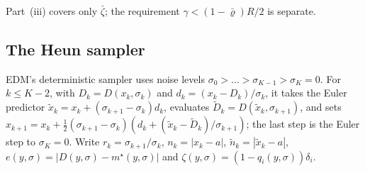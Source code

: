 \documentclass{article} %
\theoremstyle{plain}
\theoremstyle{definition}
\theoremstyle{remark}
\begin{document}
Part~(iii) covers only $\bar\zeta$; the requirement $\gamma<(1-\bar\varrho)R/2$ is separate.

\subsection{The Heun sampler}
\label{apx:pf-heun}

EDM's deterministic sampler uses noise levels $\sigma_0>\dots>\sigma_{K-1}>\sigma_K=0$. For
$k\le K-2$, with $D_k=D(x_k,\sigma_k)$ and $d_k=(x_k-D_k)/\sigma_k$, it takes the Euler predictor
$\tilde x_k=x_k+(\sigma_{k+1}-\sigma_k)d_k$, evaluates $\tilde D_k=D(\tilde x_k,\sigma_{k+1})$, and sets
$x_{k+1}=x_k+\tfrac12(\sigma_{k+1}-\sigma_k)(d_k+(\tilde x_k-\tilde D_k)/\sigma_{k+1})$; the last step
is the Euler step to $\sigma_K=0$. Write $r_k=\sigma_{k+1}/\sigma_k$, $n_k=|x_k-a|$,
$\tilde n_k=|\tilde x_k-a|$, $e(y,\sigma)=|D(y,\sigma)-m^\star(y,\sigma)|$ and
$\zeta(y,\sigma)=(1-q_i(y,\sigma))\delta_i$.
\end{document}
